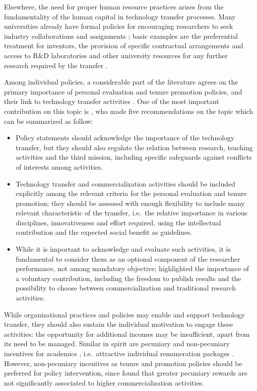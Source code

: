 Elsewhere, the need for proper human resource practices arises from the fundamentality of the human capital in technology transfer processes. Many universities already have formal policies for encouraging researchers to seek industry collaborations and assignments \citep{DEste2011}; basic examples are the preferential treatment for inventors, the provision of specific contractual arrangements and access to R\&D laboratories and other university resources for any further research required by the transfer \citep{Fini2009}.

Among individual policies, a considerable part of the literature agrees on the primary importance of personal evaluation and tenure promotion policies, and their link to technology transfer activities \citep{Debackere2005}. One of the most important contribution on this topic is \citet{Genshaft2016}, who made five recommendations on the topic which can be summarized as follow:
\begin{itemize}
\item Policy statements should acknowledge the importance of the technology transfer, but they should also regulate the relation between research, teaching activities and the third mission, including specific safeguards against conflicts of interests among activities.
\item Technology transfer and commercialization activities should be included explicitly among the relevant criteria for the personal evaluation and tenure promotion; they should be assessed with enough flexibility to include many relevant characteristic of the transfer, i.e.\ the relative importance in various disciplines, innovativeness and effort required, using the intellectual contribution and the expected social benefit as guidelines. 
\item While it is important to acknowledge and evaluate such activities, it is fundamental to consider them as an optional component of the researcher performance, not among mandatory objective; \citet{Rasmussen2006} highlighted the importance of a voluntary contribution, including the freedom to publish results and the possibility to choose between commercialization and traditional research activities. 
\end{itemize}

While organizational practices and policies may enable and support technology transfer, they should also sustain the individual motivation to engage these activities: the opportunity for additional incomes may be insufficient, apart from its need to be managed. Similar in spirit are pecuniary and non-pecuniary incentives for academics \citep{Link2007}, i.e.\ attractive individual remuneration packages \citep{Debackere2005}. However, non-pecuniary incentives as tenure and promotion policies should be preferred for policy intervention, since \citet{Friedman2003} found that greater pecuniary rewards are not significantly associated to higher commercialization activities.

